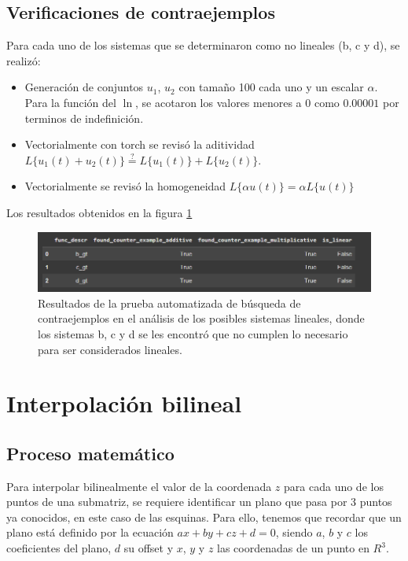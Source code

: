 \documentclass[12pt,a4paper]{article}
\begin{document}
\subsection{Verificaciones de contraejemplos}
\label{subsec:contraejemplos}

Para cada uno de los sistemas que se determinaron como no lineales (b, c y d), se realizó:
\begin{itemize}
    \item Generación de conjuntos $u_1$, $u_2$ con tamaño 100 cada uno y un escalar $\alpha$. Para la función del $\ln$, se acotaron los valores menores a 0 como $0.00001$ por terminos de indefinición.
    \item Vectorialmente con torch se revisó la aditividad $L\{u_1(t)+u_2(t)\} \overset{?}{=} L\{u_1(t)\}+L\{u_2(t)\}$.
    \item Vectorialmente se revisó la homogeneidad $L\{\alpha u(t)\} = \alpha L\{u(t)\}$
\end{itemize}

Los resultados obtenidos en la figura \ref{fig:counterexamples}

\begin{figure}[h!]
    \centering
    \includegraphics[width=\textwidth]{../img/counterexamples.PNG}
    \caption{Resultados de la prueba automatizada de búsqueda de contraejemplos en el análisis de los posibles sistemas lineales, donde los sistemas b, c y d se les encontró que no cumplen lo necesario para ser considerados lineales.}
    \label{fig:counterexamples}
\end{figure}

\section{Interpolación bilineal}

\subsection{Proceso matemático}

Para interpolar bilinealmente el valor de la coordenada $z$ para cada uno de los puntos de una submatriz, se requiere identificar un plano que pasa por 3 puntos ya conocidos, en este caso de las esquinas. Para ello, tenemos que recordar que un plano está definido por la ecuación $ax + by + cz + d = 0$, siendo $a$, $b$ y $c$ los coeficientes del plano, $d$ su offset y $x$, $y$ y $z$ las coordenadas de un punto en $R^3$. \\
\end{document}
